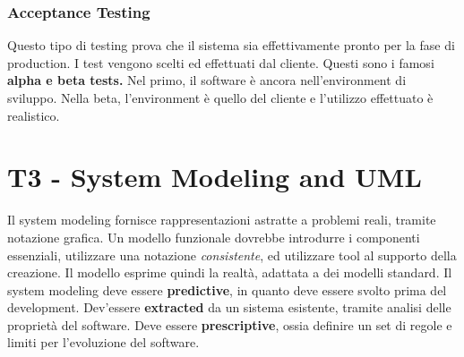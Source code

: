 \documentclass[11pt]{article}
\begin{document}
\subsubsection{Acceptance Testing}
Questo tipo di testing prova che il sistema sia effettivamente pronto per la fase di production. I test vengono scelti ed effettuati dal cliente. Questi sono i famosi \textbf{alpha e beta tests.} Nel primo, il software è ancora nell'environment di sviluppo. Nella beta, l'environment è quello del cliente e l'utilizzo effettuato è realistico. 
\section{T3 - System Modeling and UML}
Il system modeling fornisce rappresentazioni astratte a problemi reali, tramite notazione grafica. Un modello funzionale dovrebbe introdurre i componenti essenziali, utilizzare una notazione \textit{consistente}, ed utilizzare tool al supporto della creazione. Il modello esprime quindi la realtà, adattata a dei modelli standard. Il system modeling deve essere \textbf{predictive}, in quanto deve essere svolto prima del development. Dev'essere \textbf{extracted} da un sistema esistente, tramite analisi delle proprietà del software. Deve essere \textbf{prescriptive}, ossia definire un set di regole e limiti per l'evoluzione del software. 
\end{document}
